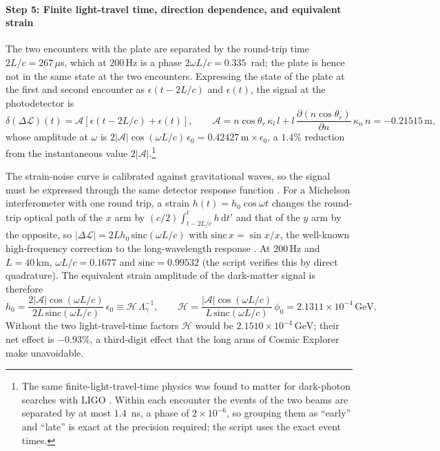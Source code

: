\paragraph*{Step 5: Finite light-travel time, direction dependence, and equivalent strain}
The two encounters with the plate are separated by the round-trip time $2L/c=267\,\mu$s, which at $200\,\mathrm{Hz}$ is a phase $2\omega L/c=0.335$~rad; the plate is hence not in the same state at the two encounters. Expressing the state of the plate at the first and second encounter as $\epsilon(t-2L/c)$ and $\epsilon(t)$, the signal at the photodetector is
\begin{equation}
\delta(\Delta\mathcal L)(t)=\mathcal A\left[\epsilon(t-2L/c)+\epsilon(t)\right],\qquad
\mathcal A=n\cos\theta_r\,\kappa_l\,l+l\,\frac{\partial(n\cos\theta_r)}{\partial n}\,\kappa_n\,n=-0.21515\,\mathrm{m},
\end{equation}
whose amplitude at $\omega$ is $2|\mathcal A|\cos(\omega L/c)\,\epsilon_0=0.42427\,\mathrm{m}\times\epsilon_0$, a $1.4\%$ reduction from the instantaneous value $2|\mathcal A|$.\footnote{The same finite-light-travel-time physics was found to matter for dark-photon searches with LIGO \citep{LVK2022}. Within each encounter the events of the two beams are separated by at most $1.4$~ns, a phase of $2\times10^{-6}$, so grouping them as ``early'' and ``late'' is exact at the precision required; the script uses the exact event times.}

The strain-noise curve is calibrated against gravitational waves, so the signal must be expressed through the same detector response function \citep{Rakhmanov2008}. For a Michelson interferometer with one round trip, a strain $h(t)=h_0\cos\omega t$ changes the round-trip optical path of the $x$ arm by $(c/2)\int_{t-2L/c}^{t}h\,\mathrm{d}t'$ and that of the $y$ arm by the opposite, so $|\Delta\mathcal L|=2Lh_0\,\mathrm{sinc}(\omega L/c)$ with $\mathrm{sinc}\,x=\sin x/x$, the well-known high-frequency correction to the long-wavelength response \citep[Eq.~14 at normal incidence]{Rakhmanov2008}. At $200\,\mathrm{Hz}$ and $L=40\,\mathrm{km}$, $\omega L/c=0.1677$ and $\mathrm{sinc}=0.99532$ (the script verifies this by direct quadrature). The equivalent strain amplitude of the dark-matter signal is therefore
\begin{equation}
h_0=\frac{2|\mathcal A|\cos(\omega L/c)}{2L\,\mathrm{sinc}(\omega L/c)}\,\epsilon_0\equiv\mathcal H\,\Lambda_\gamma^{-1},\qquad
\mathcal H=\frac{|\mathcal A|\cos(\omega L/c)}{L\,\mathrm{sinc}(\omega L/c)}\,\phi_0=2.1311\times10^{-4}\,\mathrm{GeV}.
\label{eq:H}
\end{equation}
Without the two light-travel-time factors $\mathcal H$ would be $2.1510\times10^{-4}\,\mathrm{GeV}$; their net effect is $-0.93\%$, a third-digit effect that the long arms of Cosmic Explorer make unavoidable.


